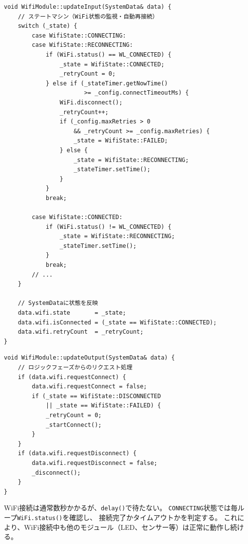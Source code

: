 \begin{lstlisting}[style=cppstyle, caption={WifiModule.cpp — updateInput()のステートマシン}]
void WifiModule::updateInput(SystemData& data) {
    // ステートマシン（WiFi状態の監視・自動再接続）
    switch (_state) {
        case WifiState::CONNECTING:
        case WifiState::RECONNECTING:
            if (WiFi.status() == WL_CONNECTED) {
                _state = WifiState::CONNECTED;
                _retryCount = 0;
            } else if (_stateTimer.getNowTime()
                       >= _config.connectTimeoutMs) {
                WiFi.disconnect();
                _retryCount++;
                if (_config.maxRetries > 0
                    && _retryCount >= _config.maxRetries) {
                    _state = WifiState::FAILED;
                } else {
                    _state = WifiState::RECONNECTING;
                    _stateTimer.setTime();
                }
            }
            break;

        case WifiState::CONNECTED:
            if (WiFi.status() != WL_CONNECTED) {
                _state = WifiState::RECONNECTING;
                _stateTimer.setTime();
            }
            break;
        // ...
    }

    // SystemDataに状態を反映
    data.wifi.state       = _state;
    data.wifi.isConnected = (_state == WifiState::CONNECTED);
    data.wifi.retryCount  = _retryCount;
}
\end{lstlisting}

\begin{lstlisting}[style=cppstyle, caption={WifiModule.cpp — updateOutput()のリクエスト処理}]
void WifiModule::updateOutput(SystemData& data) {
    // ロジックフェーズからのリクエスト処理
    if (data.wifi.requestConnect) {
        data.wifi.requestConnect = false;
        if (_state == WifiState::DISCONNECTED
            || _state == WifiState::FAILED) {
            _retryCount = 0;
            _startConnect();
        }
    }
    if (data.wifi.requestDisconnect) {
        data.wifi.requestDisconnect = false;
        _disconnect();
    }
}
\end{lstlisting}

\begin{pointbox}[ノンブロッキングなステートマシン]
WiFi接続は通常数秒かかるが、\texttt{delay()}で待たない。
\texttt{CONNECTING}状態では毎ループ\texttt{WiFi.status()}を確認し、
接続完了かタイムアウトかを判定する。
これにより、WiFi接続中も他のモジュール（LED、センサー等）は正常に動作し続ける。
\end{pointbox}

